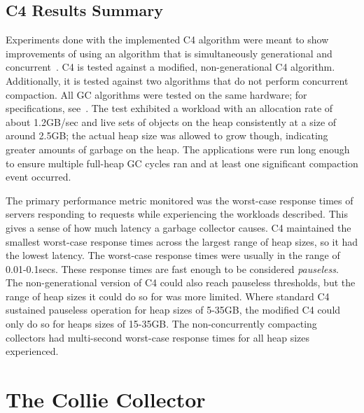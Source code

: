 \documentclass{sig-alternate}
\begin{document}
\subsection{C4 Results Summary}
\label{sec:c4Results}

Experiments done with the implemented C4 algorithm were meant to show improvements
of using an algorithm that is simultaneously generational and concurrent~\cite{Tene:C4}.
C4 is tested against a modified, non-generational C4 algorithm. Additionally,
it is tested against two algorithms that do not perform concurrent compaction. 
All GC algorithms were tested on the same hardware; for specifications, see~\cite{Tene:C4}. 
The test exhibited a workload with
an allocation rate of about 1.2GB/sec and live sets of objects on 
the heap consistently at a size of around 2.5GB; the actual heap size was allowed 
to grow though, indicating greater amounts of garbage on the heap. The applications were run long
enough to ensure multiple full-heap GC cycles ran and at least one
significant compaction event occurred.

The primary performance metric monitored was the worst-case response times
of servers responding to requests while experiencing the workloads
described. This gives a sense of how much latency a garbage collector causes. 
C4 maintained the smallest 
worst-case response times across the largest range of heap sizes, so
it had the lowest latency.
The worst-case response times were usually in the range of 0.01-0.1secs. 
These response times are fast enough to be considered \emph{pauseless}. 
The non-generational version of C4 could also reach pauseless thresholds,
but the range of heap sizes it could do so for was more limited. Where standard
C4 sustained pauseless operation for heap sizes of 5-35GB, the modified C4 could
only do so for heaps sizes of 15-35GB. The non-concurrently compacting
collectors had multi-second worst-case response times for all heap sizes experienced.


\section{The Collie Collector}
\label{sec:collie}

\end{document}

